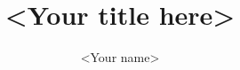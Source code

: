 \documentclass[12pt,notitlepage]{report}
\begin{document}
\title{<Your title here>}
\author{<Your name>}
\maketitle


\end{document}
